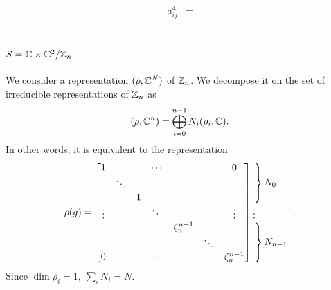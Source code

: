         \begin{align}
            a^{\boldsymbol{4}}_{ij} &= 
        \end{align}

    \subsection{$S=\mathbb{C}\times\mathbb{C}^2/\mathbb{Z}_n$}

        We consider a representation $(\rho,\mathbb{C}^N)$ of $\mathbb{Z}_n$. We decompose it on the set of irreducible representations of $\mathbb{Z}_n$ as
        \begin{equation}
            (\rho,\mathbb{C}^n)=\bigoplus^{n-1}_{i=0}N_i(\rho_i,\mathbb{C}).
        \end{equation}
        In other words, it is equivalent to the representation
        \begin{equation}
            \rho(g)=
            \begin{bmatrix}
                1 & & & \cdots & & & 0 \\
                & \ddots & & & & & \\
                & & 1 & & & &  \\
                \vdots & & & \ddots & & & \vdots \\
                & & & & \zeta^{n-1}_n & & \\
                & & & & & \ddots & \\
                0 & & & \cdots & & & \zeta^{n-1}_n 
            \end{bmatrix}
            \hspace{-0.2cm}
            \begin{tabular}{l}
            $\left.\lefteqn{\phantom{
                \begin{matrix}
                    a_0\\ \ddots\\ a_0\ 
                \end{matrix} 
            }}\right\}N_0$\\
            \vdots \\
            $\left.\lefteqn{\phantom{
                \begin{matrix}
                    b_0\\ \ddots\\ b_0\ 
                \end{matrix}
            }} \right\}N_{n-1}$
            \end{tabular}.\label{eq:reprrhoZn}
        \end{equation}
        Since $\dim\rho_i=1$, $\sum_i N_i=N$. 

